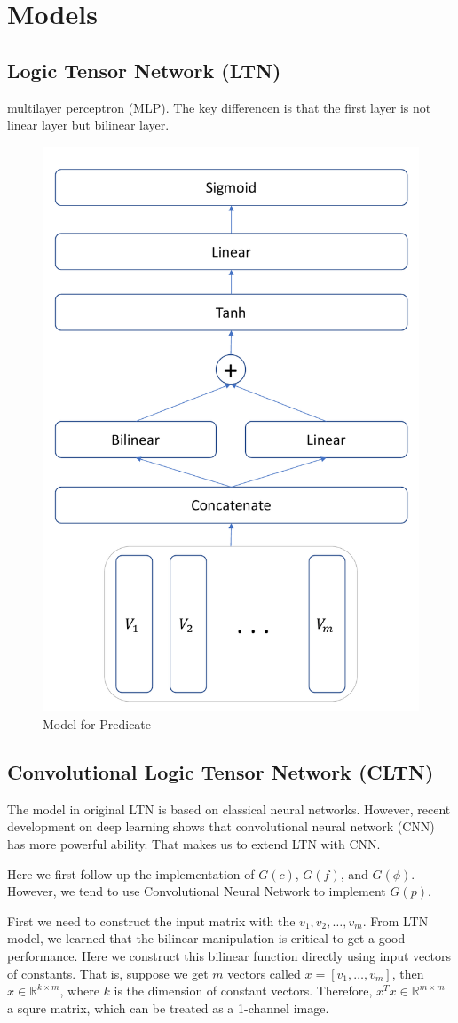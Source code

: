 
\section{Models}

\subsection{Logic Tensor Network (LTN)}

multilayer perceptron (MLP). The key differencen is that the first layer is not linear layer but bilinear layer.

\begin{figure}
    \centering
    \includegraphics[width=.4\textwidth]{img/Predicate.pdf}
    \caption{Model for Predicate}
    \label{fig:LTN_predicate}
\end{figure}

\subsection{Convolutional Logic Tensor Network (CLTN)}

The model in original LTN is based on classical neural networks. However, recent development on deep learning shows that convolutional neural network (CNN) has more powerful ability. That makes us to extend LTN with CNN.

Here we first follow up the implementation of $G(c)$, $G(f)$, and $G(\phi)$. However, we tend to use Convolutional Neural Network to implement $G(p)$.

First we need to construct the input matrix with the $v_1,v_2,\dots,v_m$. From LTN model, we learned that the bilinear manipulation is critical to get a good performance. Here we construct this bilinear function directly using input vectors of constants. That is, suppose we get $m$ vectors called $x=[v_1,\dots,v_m]$, then $x\in \mathbb{R}^{k\times m}$, where $k$ is the dimension of constant vectors. Therefore, $x^Tx \in \mathbb{R}^{m\times m}$ a squre matrix, which can be treated as a 1-channel image.

